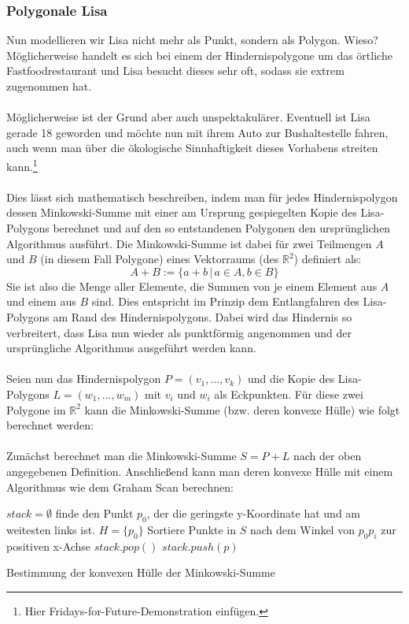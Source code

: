 \documentclass[a4paper, notitlepage, 12pt]{scrartcl}
\begin{document}
  \subsubsection{Polygonale Lisa}
 Nun modellieren wir Lisa nicht mehr als Punkt, sondern als Polygon. Wieso? Möglicherweise handelt es sich bei einem der Hindernispolygone um das örtliche Fastfoodrestaurant und Lisa besucht dieses sehr oft, sodass sie extrem zugenommen hat. \\ \\
 Möglicherweise ist der Grund aber auch unspektakulärer. Eventuell ist Lisa gerade 18 geworden und möchte nun mit ihrem Auto zur Bushaltestelle fahren, auch wenn man über die ökologische Sinnhaftigkeit dieses Vorhabens streiten kann.\footnote{Hier Fridays-for-Future-Demonstration einfügen.} \\ \\
 Dies lässt sich mathematisch beschreiben, indem man für jedes Hindernispolygon dessen Minkowski-Summe mit einer am Ursprung gespiegelten Kopie des Lisa-Polygons berechnet und auf den so entstandenen Polygonen den ursprünglichen Algorithmus ausführt. Die Minkowski-Summe ist dabei für zwei Teilmengen $A$ und $B$ (in diesem Fall Polygone) eines Vektorraums (des $\mathbb{R}^{2}$) definiert als:
 \begin{equation}
 A + B := \{a+b\,|\,a \in A, b \in B\}
 \end{equation}
 Sie ist also die Menge aller Elemente, die Summen von je einem Element aus $A$ und einem aus $B$ sind.\cite{Src:minkowski} Dies entspricht im Prinzip dem Entlangfahren des Lisa-Polygons am Rand des Hindernispolygons. Dabei wird das Hindernis so verbreitert, dass Lisa nun wieder als punktförmig angenommen und der ursprüngliche Algorithmus ausgeführt werden kann. \\ \\
 Seien nun das Hindernispolygon $P = (v_1,...,v_k)$ und die Kopie des Lisa-Polygons $L = (w_1,...,w_m)$ mit $v_i$ und $w_i$ als Eckpunkten. Für diese zwei Polygone im $\mathbb{R}^{2}$ kann die Minkowski-Summe (bzw. deren konvexe Hülle) wie folgt berechnet werden: \\ \\
 Zunächst berechnet man die Minkowski-Summe $S = P + L$ nach der oben angegebenen Definition. Anschließend kann man deren konvexe Hülle mit einem Algorithmus wie dem Graham Scan berechnen:
 \begin{algorithm}[H]
\begin{algorithmic}
	\State $stack = \emptyset$ 
	\State finde den Punkt $p_0$, der die geringste y-Koordinate hat und am weitesten links ist.
	\State $H = \{p_0\}$ 
	\State Sortiere Punkte in $S$ nach dem Winkel von $p_0p_i$ zur positiven x-Achse
	\State $stack.pop()$
	\EndWhile
	\State $stack.push(p)$
	\EndFor
	\EndFunction
\end{algorithmic}
\caption{Bestimmung der konvexen Hülle der Minkowski-Summe}
\end{algorithm}
\end{document}
